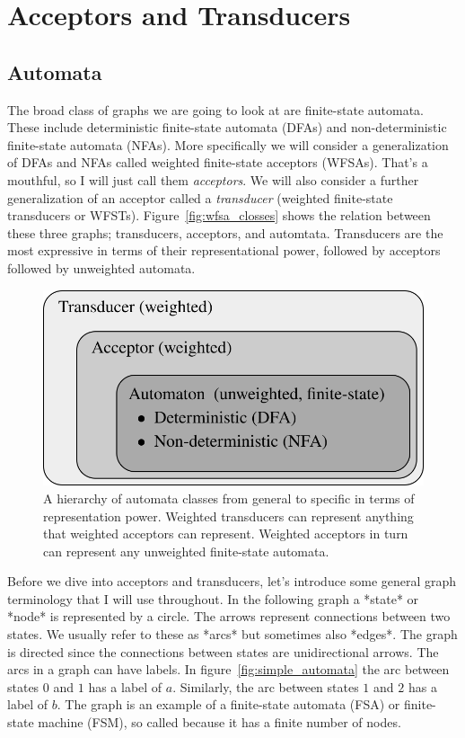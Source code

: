 \documentclass[main.tex]{subfiles}
\begin{document}
\section{Acceptors and Transducers}
\label{sec:acceptors_transducers}

\subsection{Automata}
\label{sec:automata}

The broad class of graphs we are going to look at are finite-state automata.
These include deterministic finite-state automata (DFAs) and non-deterministic
finite-state automata (NFAs). More specifically we will consider a
generalization of DFAs and NFAs called weighted finite-state acceptors (WFSAs).
That's a mouthful, so I will just call them \emph{acceptors}. We will also
consider a further generalization of an acceptor called a \emph{transducer}
(weighted finite-state transducers or WFSTs). Figure~\ref{fig:wfsa_closses}
shows the relation between these three graphs; transducers, acceptors, and
automtata. Transducers are the most expressive in terms of their
representational power, followed by acceptors followed by unweighted automata.

\begin{figure}
    \centering
    \includegraphics[width=0.7\linewidth]{figures/wfsa_classes}
    \caption{A hierarchy of automata classes from general to specific in terms
    of representation power. Weighted transducers can represent anything that
    weighted acceptors can represent. Weighted acceptors in turn can represent
    any unweighted finite-state automata.}
    \label{fig:wfsa_classes}
\end{figure}

Before we dive into acceptors and transducers, let's introduce some general
graph terminology that I will use throughout. In the following graph a *state*
or *node* is represented by a circle. The arrows represent connections between
two states. We usually refer to these as *arcs* but sometimes also *edges*. The
graph is directed since the connections between states are unidirectional
arrows. The arcs in a graph can have labels. In
figure~\ref{fig:simple_automata} the arc between states $0$ and $1$ has a label
of $a$. Similarly, the arc between states $1$ and $2$ has a label of $b$. The
graph is an example of a finite-state automata (FSA) or finite-state machine
(FSM), so called because it has a finite number of nodes.
\end{document}
